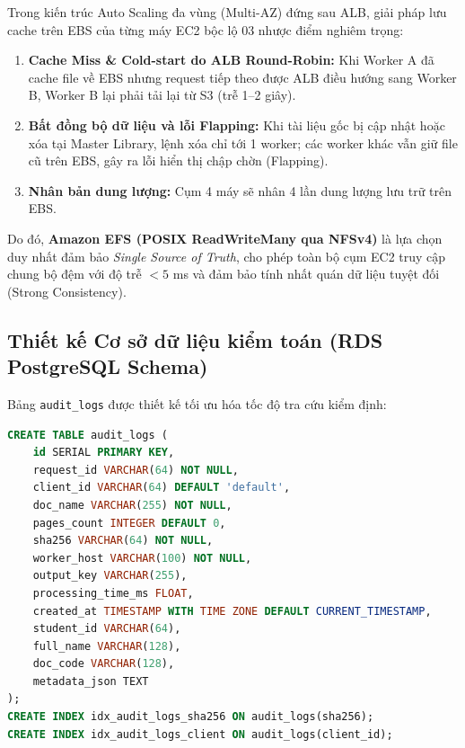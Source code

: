 \documentclass[12pt,a4paper]{report}
\begin{document}
Trong kiến trúc Auto Scaling đa vùng (Multi-AZ) đứng sau ALB, giải pháp lưu cache trên EBS của từng máy EC2 bộc lộ 03 nhược điểm nghiêm trọng:
\begin{enumerate}
    \item \textbf{Cache Miss \& Cold-start do ALB Round-Robin:} Khi Worker A đã cache file về EBS nhưng request tiếp theo được ALB điều hướng sang Worker B, Worker B lại phải tải lại từ S3 (trễ 1--2 giây).
    \item \textbf{Bất đồng bộ dữ liệu và lỗi Flapping:} Khi tài liệu gốc bị cập nhật hoặc xóa tại Master Library, lệnh xóa chỉ tới 1 worker; các worker khác vẫn giữ file cũ trên EBS, gây ra lỗi hiển thị chập chờn (Flapping).
    \item \textbf{Nhân bản dung lượng:} Cụm 4 máy sẽ nhân 4 lần dung lượng lưu trữ trên EBS.
\end{enumerate}
Do đó, \textbf{Amazon EFS (POSIX ReadWriteMany qua NFSv4)} là lựa chọn duy nhất đảm bảo \textit{Single Source of Truth}, cho phép toàn bộ cụm EC2 truy cập chung bộ đệm với độ trễ $<5$ ms và đảm bảo tính nhất quán dữ liệu tuyệt đối (Strong Consistency).

\subsection{Thiết kế Cơ sở dữ liệu kiểm toán (RDS PostgreSQL Schema)}
Bảng \texttt{audit\_logs} được thiết kế tối ưu hóa tốc độ tra cứu kiểm định:
\begin{lstlisting}[language=SQL]
CREATE TABLE audit_logs (
    id SERIAL PRIMARY KEY,
    request_id VARCHAR(64) NOT NULL,
    client_id VARCHAR(64) DEFAULT 'default',
    doc_name VARCHAR(255) NOT NULL,
    pages_count INTEGER DEFAULT 0,
    sha256 VARCHAR(64) NOT NULL,
    worker_host VARCHAR(100) NOT NULL,
    output_key VARCHAR(255),
    processing_time_ms FLOAT,
    created_at TIMESTAMP WITH TIME ZONE DEFAULT CURRENT_TIMESTAMP,
    student_id VARCHAR(64),
    full_name VARCHAR(128),
    doc_code VARCHAR(128),
    metadata_json TEXT
);
CREATE INDEX idx_audit_logs_sha256 ON audit_logs(sha256);
CREATE INDEX idx_audit_logs_client ON audit_logs(client_id);
\end{lstlisting}
\end{document}
